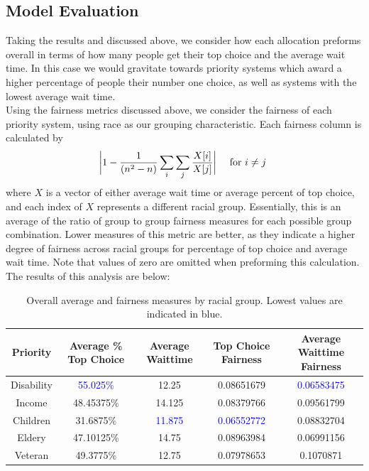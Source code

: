 \documentclass[11pt]{article}
\begin{document}
\subsection{Model Evaluation}
Taking the results and discussed above, we consider how each allocation preforms overall in terms of how many people get their top choice and the average wait time. In this case we would gravitate towards priority systems which award a higher percentage of people their number one choice, as well as systems with the lowest average wait time. \\
\newline
Using the fairness metrics discussed above, we consider the fairness of each priority system, using race as our grouping characteristic. Each fairness column is calculated by
$$
\biggr{|}1 - \frac{1}{(n^2 - n)}\sum_i \sum_j \frac{X[i]}{X[j]}\biggr{|} \quad \text{ for } i \neq j\
$$
where $X$ is a vector of either average wait time or average percent of top choice, and each index of $X$ represents a different racial group. Essentially, this is an average of the ratio of group to group fairness measures for each possible group combination. Lower measures of this metric are better, as they indicate a higher degree of fairness across racial groups for percentage of top choice and average wait time. Note that values of zero are omitted when preforming this calculation.\\
\newline
The results of this analysis are below:
    \begin{table}[H]
        \centering
        \begin{tabular}{c|c|c|c|c}
             Priority &  Average \% Top Choice & Average Waittime & Top Choice Fairness & Average Waittime Fairness \\
             \hline
             Disability & \textcolor{blue}{55.025\%} & 12.25 & 0.08651679 & \textcolor{blue}{0.06583475}\\
             Income & 48.45375\% & 14.125 & 0.08379766 &  0.09561799\\
             Children & 31.6875\% & \textcolor{blue}{11.875} & \textcolor{blue}{0.06552772} &  0.08832704 \\
             Eldery & 47.10125\% & 14.75 & 0.08963984 & 0.06991156 \\
             Veteran & 49.3775\% & 12.75 & 0.07978653 & 0.1070871 \\
        \end{tabular}
        \caption{Overall average and fairness measures by racial group. Lowest values are indicated in blue.}
        \label{tab:my_label}
    \end{table}
\end{document}
